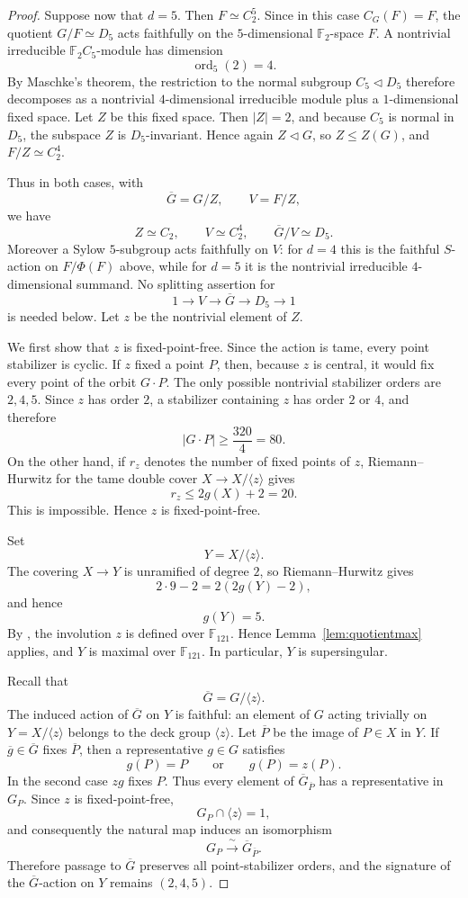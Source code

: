 \documentclass[11pt]{amsart}
\theoremstyle{remark}
\newcommand{\F}{\mathbb F}
\begin{document}
\begin{proof}
Suppose now that $d=5$. Then $F\simeq C_2^5$. Since in this case
$C_G(F)=F$, the quotient $G/F\simeq D_5$ acts faithfully on the
$5$-dimensional $\F_2$-space $F$. A nontrivial irreducible
$\F_2C_5$-module has dimension
\[
        \operatorname{ord}_5(2)=4.
\]
By Maschke's theorem, the restriction to the normal subgroup
$C_5\triangleleft D_5$ therefore decomposes as a nontrivial
$4$-dimensional irreducible module plus a $1$-dimensional fixed space.
Let $Z$ be this fixed space. Then $|Z|=2$, and because $C_5$ is normal
in $D_5$, the subspace $Z$ is $D_5$-invariant. Hence again
$Z\triangleleft G$, so $Z\le Z(G)$, and $F/Z\simeq C_2^4$.

Thus in both cases, with
\[
        \overline G=G/Z,\qquad V=F/Z,
\]
we have
\[
        Z\simeq C_2,\qquad V\simeq C_2^4,\qquad
        \overline G/V\simeq D_5.
\]
Moreover a Sylow $5$-subgroup acts faithfully on $V$: for $d=4$ this
is the faithful $S$-action on $F/\Phi(F)$ above, while for $d=5$ it is the
nontrivial irreducible $4$-dimensional summand. No splitting assertion
for
\[
1\longrightarrow V\longrightarrow \overline G
\longrightarrow D_5\longrightarrow1
\]
is needed below. Let $z$ be the nontrivial element of $Z$.

We first show that $z$ is fixed-point-free. Since the action is tame,
every point stabilizer is cyclic. If $z$ fixed a point $P$, then,
because $z$ is central, it would fix every point of the orbit
$G\cdot P$. The only possible nontrivial stabilizer orders are
$2,4,5$. Since $z$ has order $2$, a stabilizer containing $z$ has
order $2$ or $4$, and therefore
\[
|G\cdot P|\ge\frac{320}{4}=80.
\]
On the other hand, if $r_z$ denotes the number of fixed points of $z$,
Riemann--Hurwitz for the tame double cover
$X\to X/\langle z\rangle$ gives
\[
r_z\le2g(X)+2=20.
\]
This is impossible. Hence $z$ is fixed-point-free.

Set
\[
Y=X/\langle z\rangle.
\]
The covering $X\to Y$ is unramified of degree $2$, so
Riemann--Hurwitz gives
\[
2\cdot9-2=2(2g(Y)-2),
\]
and hence
\[
g(Y)=5.
\]
By \cite[Theorem~3.10]{GSY}, the involution $z$ is defined over
$\F_{121}$. Hence Lemma~\ref{lem:quotientmax} applies, and $Y$ is
maximal over $\F_{121}$. In particular, $Y$ is supersingular.

Recall that
\[
\overline G=G/\langle z\rangle.
\]
The induced action of $\overline G$ on $Y$ is faithful: an element of
$G$ acting trivially on $Y=X/\langle z\rangle$ belongs to the deck group
$\langle z\rangle$.
Let $\overline P$ be the image of $P\in X$ in $Y$. If
$\overline g\in\overline G$ fixes $\overline P$, then a representative
$g\in G$ satisfies
\[
g(P)=P\qquad\text{or}\qquad g(P)=z(P).
\]
In the second case $zg$ fixes $P$. Thus every element of
$\overline G_{\overline P}$ has a representative in $G_P$. Since
$z$ is fixed-point-free,
\[
G_P\cap\langle z\rangle=1,
\]
and consequently the natural map induces an isomorphism
\[
G_P\xrightarrow{\;\sim\;}\overline G_{\overline P}.
\]
Therefore passage to $\overline G$ preserves all point-stabilizer
orders, and the signature of the $\overline G$-action on $Y$ remains
$(2,4,5)$.


\end{proof}
\end{document}

